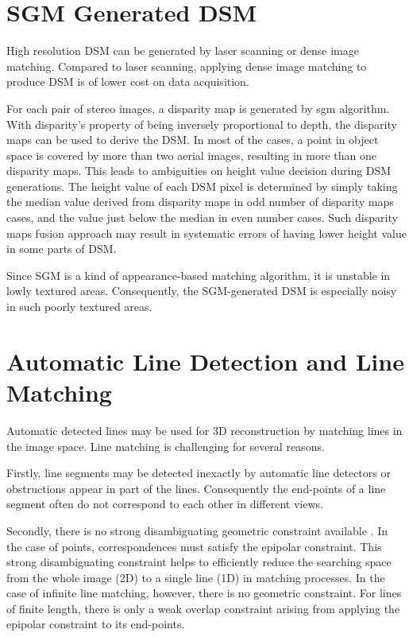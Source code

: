 \section{SGM Generated DSM}

High resolution DSM can be generated by laser scanning or dense image matching. Compared to laser scanning, applying dense image matching to produce DSM is of lower cost on data acquisition.

For each pair of stereo images, a disparity map is generated by \gls{sgm} algorithm. With disparity's property of being inversely proportional to depth, the disparity maps can be used to derive the DSM. In most of the cases, a point in object space is covered by more than two aerial images, resulting in more than one disparity maps. This leads to ambiguities on height value decision during DSM generations. The height value of each DSM pixel is determined by simply taking the median value derived from disparity maps in odd number of disparity maps cases, and the value just below the median in even number cases. Such disparity maps fusion approach may result in systematic errors of having lower height value in some parts of DSM.

Since SGM is a kind of appearance-based matching algorithm, it is unstable in lowly textured areas. Consequently, the SGM-generated DSM is especially noisy in such poorly textured areas.



\section{Automatic Line Detection and Line Matching}

Automatic detected lines may be used for 3D reconstruction by matching lines in the image space. Line matching is challenging for several reasons.

Firstly, line segments may be detected inexactly by automatic line detectors or obstructions appear in part of the lines. Consequently the end-points of a line segment often do not correspond to each other in different views.

Secondly, there is no strong disambiguating geometric constraint available \cite{SchmidJun1997}. In the case of points, correspondences must satisfy the epipolar constraint. This strong disambiguating constraint helps to efficiently reduce the searching space from the whole image (2D) to a single line (1D) in matching processes. In the case of infinite line matching, however, there is no geometric constraint. For lines of finite length, there is only a weak overlap constraint arising from applying the epipolar constraint to its end-points.

